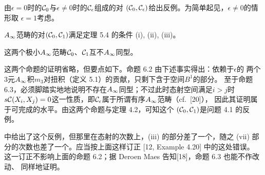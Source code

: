 由$\epsilon=0$时的$\mathcal{C}_0$与$\epsilon\neq0$时的$\mathcal{C}_\epsilon$组成的对
$(\mathcal{C}_0,\mathcal{C}_\epsilon)$给出反例。为简单起见，$\epsilon\neq0$的情形取
$\epsilon=1$考虑。


\begin{proposition}[{[12, Proposition 4.21]}]
  $A_{\infty}$范畴的对$(\mathcal{C}_0,\mathcal{C}_1)$满足定理 5.4 的条件 (i), (ii), (iii)。
  \label{prop:c05-6.2}
\end{proposition}

\begin{proposition}[{[12, Proposition 4.22]}]
  这两个极小$A_{\infty}$范畴$\mathcal{C}_0$、$\mathcal{C}_1$互不$A_{\infty}$同型。
  \label{prop:c05-6.3}
\end{proposition}

这两个命题的证明省略，但要点如下。命题 6.2 由下述事实得出：依赖于$\epsilon$的
两个$3$元$A_{\infty}$积$m_3$对扭积（定义 5.1）的贡献，只剩下含于空间$B^1$的部分。
至于命题 6.3，必须脚踏实地地说明不存在$A_{\infty}$同型；不过此时态射空间满足$i>j$时
$s\mathcal{C}(X_i,X_j)=0$这一性质，即$\mathcal{C}_\epsilon$属于所谓有序$A_{\infty}$范畴（cf.\ [20]），
因此其证明属于可完成的水平。由这两个命题与定理 4.2，可知这个
$(\mathcal{C}_0,\mathcal{C}_1)$是问题 4.1 的反例。

\begin{remark}
  [12] 中给出了这个反例，但那里在态射的次数上，(iii) 的部分差了一个，随之 (vii)
  部分的次数也差了一个。应当按上面这样订正 [12, Example 4.20] 中的这处错误。
  这一订正不影响上面的命题 6.2；据 Deroen Maes 告知[18]，命题 6.3 也能不作改动、
  同样地证明。
  \label{rem:c05-6.4}
\end{remark}

